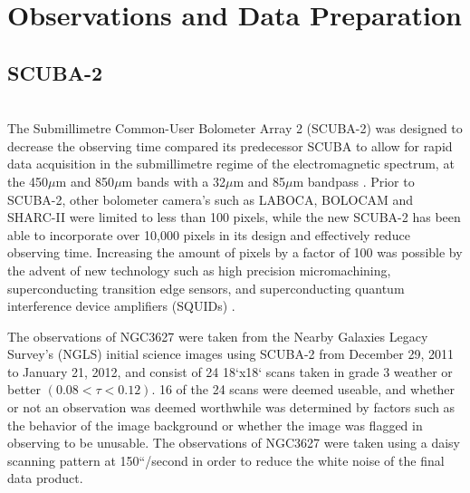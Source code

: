 \chapter{Observations and Data Preparation}\label{observations}

\section{SCUBA-2} \\
The Submillimetre Common-User Bolometer Array 2 (SCUBA-2) was designed to decrease the observing time compared its predecessor SCUBA to allow for rapid data acquisition in the submillimetre regime of the electromagnetic spectrum, at the 450$\mu$m and 850$\mu$m bands with a 32$\mu$m and 85$\mu$m bandpass \citet{holland2013}.  Prior to SCUBA-2, other bolometer camera's such as LABOCA, BOLOCAM and SHARC-II were limited to less than 100 pixels, while the new SCUBA-2 has been able to incorporate over 10,000 pixels in its design and effectively reduce observing time.  Increasing the amount of pixels by a factor of 100 was possible by the advent of new technology such as high precision micromachining, superconducting transition edge sensors, and superconducting quantum interference device amplifiers (SQUIDs) \citet{holland2013}.

The observations of NGC3627 were taken from the Nearby Galaxies Legacy Survey's (NGLS) initial science images using SCUBA-2 from December 29, 2011  to January 21, 2012, and consist of 24 18`x18` scans taken in grade 3 weather or better $(0.08 < \tau <0.12)$.  16 of the 24 scans were deemed useable, and whether or not an observation was deemed worthwhile was determined by factors such as the behavior of the image background or whether the image was flagged in observing to be unusable.  The observations of NGC3627 were taken using a daisy scanning pattern at 150``/second in order to reduce the white noise of the final data product. 

